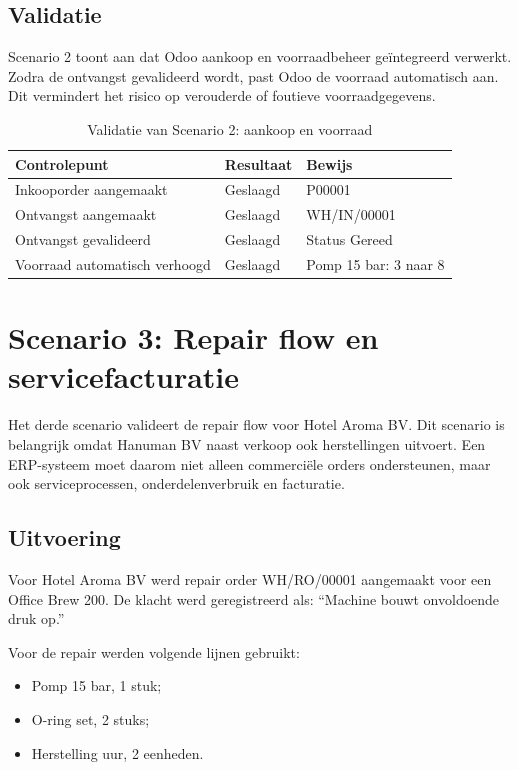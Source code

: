 \subsection{Validatie}

Scenario 2 toont aan dat Odoo aankoop en voorraadbeheer geïntegreerd verwerkt. Zodra de ontvangst gevalideerd wordt, past Odoo de voorraad automatisch aan. Dit vermindert het risico op verouderde of foutieve voorraadgegevens.

\begin{table}[H]
    \centering
    \caption{Validatie van Scenario 2: aankoop en voorraad}
    \label{tab:poc-s2}
    \begin{tabular}{p{}p{}p{}}
        \toprule
        \textbf{Controlepunt} & \textbf{Resultaat} & \textbf{Bewijs} \\
        \midrule
        Inkooporder aangemaakt & Geslaagd & P00001 \\
        Ontvangst aangemaakt & Geslaagd & WH/IN/00001 \\
        Ontvangst gevalideerd & Geslaagd & Status Gereed \\
        Voorraad automatisch verhoogd & Geslaagd & Pomp 15 bar: 3 naar 8 \\
        \bottomrule
    \end{tabular}
\end{table}

\section{Scenario 3: Repair flow en servicefacturatie}
\label{sec:poc-s3}

Het derde scenario valideert de repair flow voor Hotel Aroma BV. Dit scenario is belangrijk omdat Hanuman BV naast verkoop ook herstellingen uitvoert. Een ERP-systeem moet daarom niet alleen commerciële orders ondersteunen, maar ook serviceprocessen, onderdelenverbruik en facturatie.

\subsection{Uitvoering}

Voor Hotel Aroma BV werd repair order WH/RO/00001 aangemaakt voor een Office Brew 200. De klacht werd geregistreerd als: ``Machine bouwt onvoldoende druk op.''

Voor de repair werden volgende lijnen gebruikt:

\begin{itemize}
    \item Pomp 15 bar, 1 stuk;
    \item O-ring set, 2 stuks;
    \item Herstelling uur, 2 eenheden.
\end{itemize}

